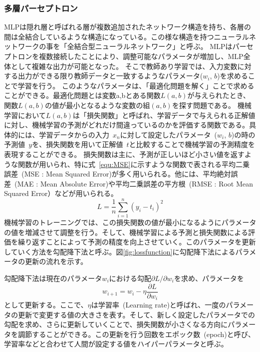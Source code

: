 \subsubsection{多層パーセプトロン}
MLPは隠れ層と呼ばれる層が複数追加されたネットワーク構造を持ち、各層の間は全結合しているような構造になっている。この様な構造を持つニューラルネットワークの事を「全結合型ニューラルネットワーク」と呼ぶ。
MLPはパーセプトロンを複数接続したことにより、調整可能なパラメータが増加し、MLP全体として複雑な出力が可能となった。
そこで教師あり学習では、入力変数に対する出力ができる限り教師データと一致するようなパラメータ($w_i$, $b$)を求めることで学習を行う。
このようなパラメータは、「最適化問題を解く」ことで求めることができる。最適化問題とは変数a,bとある関数$L(a,b)$が与えられたとき、関数$L(a,b)$の値が最小となるような変数の組$(a,b)$を探す問題である。
機械学習において$L(a,b)$は「損失関数」と呼ばれ、学習データで与えられる正解値に対し、機械学習の予測がどれだけ間違っているのかを評価する関数である。具体的には、学習データからの入力~$x_n$に対して設定したパラメータ~($w_i$, $b$)の時の予測値~$y$を、損失関数を用いて正解値~$t$と比較することで機械学習の予測精度を表現することができる。
損失関数は主に、予測が正しいほど小さい値を返すような関数が用いられ、特に式~\eqref{equ:MSE}に示すような関数で表される平均二乗誤差~(MSE : Mean Squared Error)が多く用いられる。他には、平均絶対誤差~(MAE : Mean Absolute Error)や平均二乗誤差の平方根~(RMSE : Root Mean Squared Error）などが用いられる。
\begin{equation}
    L = \frac{1}{n}\sum^{n}_{i=1}(y_i-t_i)^2
    \label{equ:MSE}
\end{equation}
機械学習のトレーニングでは、この損失関数の値が最小になるようにパラメータの値を増減させて調整を行う。そして、機械学習による予測と損失関数による評価を繰り返すことによって予測の精度を向上させていく。このパラメータを更新していく方法を勾配降下法と呼ぶ。図\ref{fig:lossfunction}に勾配降下法によるパラメータの更新の流れを示す。

勾配降下法は現在のパラメータ$w_i$における勾配${\partial L}/{\partial w_i}$を求め、パラメータを
\begin{equation}
    w_{i+1} = w_i - \eta\frac{\partial L}{\partial w_i}
    \label{equ:勾配}
\end{equation}
として更新する。ここで、$\eta$は学習率~(Learning rate)と呼ばれ、一度のパラメータの更新で変更する値の大きさを表す。そして、新しく設定したパラメータでの勾配を求め、さらに更新していくことで、損失関数が小さくなる方向にパラメータを調節することができる。この更新を行う回数をエポック数~(epoch)と呼び、学習率などと合わせて人間が設定する値をハイパーパラメータと呼ぶ。


